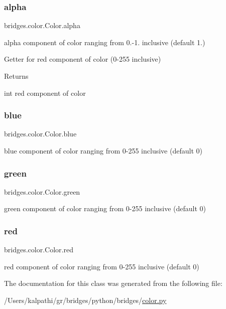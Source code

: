 \subsubsection{\texorpdfstring{alpha}{alpha}}
{\footnotesize\ttfamily bridges.\+color.\+Color.\+alpha}



alpha component of color ranging from 0.-\/1. inclusive (default 1.) 

Getter for red component of color (0-\/255 inclusive) \begin{DoxyReturn}{Returns}


int red component of color 
\end{DoxyReturn}
\mbox{\label{classbridges_1_1color_1_1_color_a2c5081c47a43419bb1c5dbbd9c72a21e}} 
\subsubsection{\texorpdfstring{blue}{blue}}
{\footnotesize\ttfamily bridges.\+color.\+Color.\+blue}



blue component of color ranging from 0-\/255 inclusive (default 0) 

\mbox{\label{classbridges_1_1color_1_1_color_a6f14b2d3ec82052c1aeb259ee687059d}} 
\subsubsection{\texorpdfstring{green}{green}}
{\footnotesize\ttfamily bridges.\+color.\+Color.\+green}



green component of color ranging from 0-\/255 inclusive (default 0) 

\mbox{\label{classbridges_1_1color_1_1_color_abb0aa417808af0140d3448a2e49d2d15}} 
\subsubsection{\texorpdfstring{red}{red}}
{\footnotesize\ttfamily bridges.\+color.\+Color.\+red}



red component of color ranging from 0-\/255 inclusive (default 0) 



The documentation for this class was generated from the following file\+:\begin{DoxyCompactItemize}
\item 
/\+Users/kalpathi/gr/bridges/python/bridges/\mbox{\hyperlink{color_8py}{color.\+py}}\end{DoxyCompactItemize}
